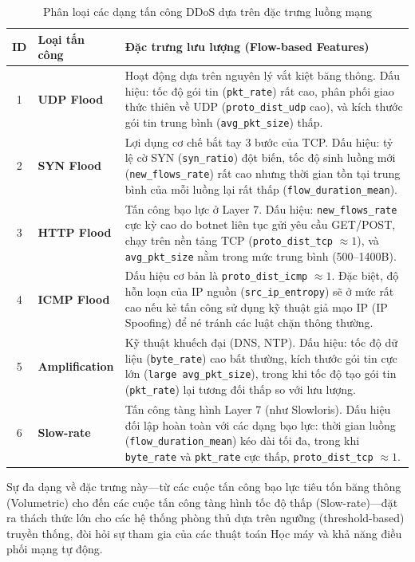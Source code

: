 \begin{table}[H]
\centering
\caption{Phân loại các dạng tấn công DDoS dựa trên đặc trưng luồng mạng}
\label{tab:ddos_classification}
\begin{tabularx}{\textwidth}{|c|l|X|}
\hline
\textbf{ID} & \textbf{Loại tấn công} & \textbf{Đặc trưng lưu lượng (Flow-based Features)} \\ \hline
1 & \textbf{UDP Flood} & Hoạt động dựa trên nguyên lý vắt kiệt băng thông. Dấu hiệu: tốc độ gói tin (\texttt{pkt\_rate}) rất cao, phân phối giao thức thiên về UDP (\texttt{proto\_dist\_udp} cao), và kích thước gói tin trung bình (\texttt{avg\_pkt\_size}) thấp. \\ \hline
2 & \textbf{SYN Flood} & Lợi dụng cơ chế bắt tay 3 bước của TCP. Dấu hiệu: tỷ lệ cờ SYN (\texttt{syn\_ratio}) đột biến, tốc độ sinh luồng mới (\texttt{new\_flows\_rate}) rất cao nhưng thời gian tồn tại trung bình của mỗi luồng lại rất thấp (\texttt{flow\_duration\_mean}). \\ \hline
3 & \textbf{HTTP Flood} & Tấn công bạo lực ở Layer 7. Dấu hiệu: \texttt{new\_flows\_rate} cực kỳ cao do botnet liên tục gửi yêu cầu GET/POST, chạy trên nền tảng TCP (\texttt{proto\_dist\_tcp} $\approx 1$), và \texttt{avg\_pkt\_size} nằm trong mức trung bình (500–1400B). \\ \hline
4 & \textbf{ICMP Flood} & Dấu hiệu cơ bản là \texttt{proto\_dist\_icmp} $\approx 1$. Đặc biệt, độ hỗn loạn của IP nguồn (\texttt{src\_ip\_entropy}) sẽ ở mức rất cao nếu kẻ tấn công sử dụng kỹ thuật giả mạo IP (IP Spoofing) để né tránh các luật chặn thông thường. \\ \hline
5 & \textbf{Amplification} & Kỹ thuật khuếch đại (DNS, NTP). Dấu hiệu: tốc độ dữ liệu (\texttt{byte\_rate}) cao bất thường, kích thước gói tin cực lớn (\texttt{large avg\_pkt\_size}), trong khi tốc độ tạo gói tin (\texttt{pkt\_rate}) lại tương đối thấp so với lưu lượng. \\ \hline
6 & \textbf{Slow-rate} & Tấn công tàng hình Layer 7 (như Slowloris). Dấu hiệu đối lập hoàn toàn với các dạng bạo lực: thời gian luồng (\texttt{flow\_duration\_mean}) kéo dài tối đa, trong khi \texttt{byte\_rate} và \texttt{pkt\_rate} cực thấp, \texttt{proto\_dist\_tcp} $\approx 1$. \\ \hline
\end{tabularx}
\end{table}

Sự đa dạng về đặc trưng này—từ các cuộc tấn công bạo lực tiêu tốn băng thông (Volumetric) cho đến các cuộc tấn công tàng hình tốc độ thấp (Slow-rate)—đặt ra thách thức lớn cho các hệ thống phòng thủ dựa trên ngưỡng (threshold-based) truyền thống, đòi hỏi sự tham gia của các thuật toán Học máy và khả năng điều phối mạng tự động.

